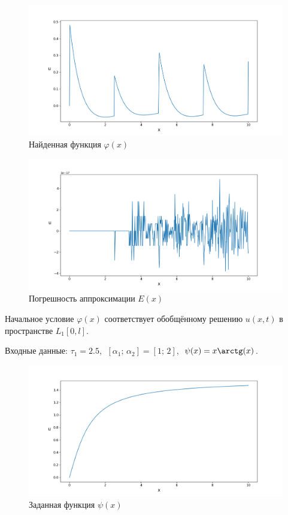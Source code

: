 \documentclass{article}
\theoremstyle{definition}
\begin{document}
\begin{figure}[H]
	\centering
	\includegraphics[trim={2.1cm, 0.6cm, 0, 1.5cm}, clip, scale=0.615]{1_u0.png}
	\caption{Найденная функция $\varphi(x)$}
	\label{fig:image2}
\end{figure}

\begin{figure}[H]
	\centering
	\includegraphics[trim={2.4cm, 0.6cm, 0, 1.5cm}, clip, scale=0.62]{1_E.png}
	\caption{Погрешность аппроксимации $E(x)$}
	\label{fig:image3}
\end{figure}

Начальное условие $\varphi(x)$ соответствует обобщённому решению $u(x,t)$ в пространстве $L_1[0,l]$.

\vspace{5mm}
Входные данные: $\tau_1 = 2.5$, $\;[\alpha_1;\, \alpha_2] = [1;\, 2]$, $\;\psi(x) = x \arctg(x)$.
\begin{figure}[H]
	\centering
	\includegraphics[trim={2.5cm, 0, 0, 1.5cm}, clip, scale=0.62]{2_psi.png}
	\caption{Заданная функция $\psi(x)$}
	\label{fig:image4}
\end{figure}
\end{document}
